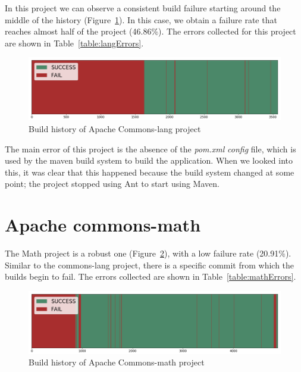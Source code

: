 
In this project we can observe a consistent build failure starting around the middle of the history (Figure~\ref{fig:langHist}).
In this case, we obtain a failure rate that reaches almost half of the project (46.86\%).
The errors collected for this project are shown in Table~\ref{table:langErrors}.

\begin{figure}[h]
	\begin{center}
		\includegraphics[width=\linewidth]{charts/LangHist}
		\caption{Build history of Apache Commons-lang project}
		\label{fig:langHist}
	\end{center}
\end{figure}

The main error of this project is the absence of the \textit{pom.xml} \emph{config} file, which is used by the maven build system to build the application.
When we looked into this, it was clear that this happened because the build system changed at some point; the project stopped using Ant to start using Maven.

\section{Apache commons-math}

The Math project is a robust one (Figure~\ref{fig:mathHist}), with a low failure rate (20.91\%).
Similar to the commons-lang project, there is a specific commit from which the builds begin to fail.
The errors collected are shown in Table~\ref{table:mathErrors}.

\begin{figure}[h]
	\begin{center}
		\includegraphics[width=\linewidth]{charts/MathHist}
		\caption{Build history of Apache Commons-math project}
		\label{fig:mathHist}
	\end{center}
\end{figure}


